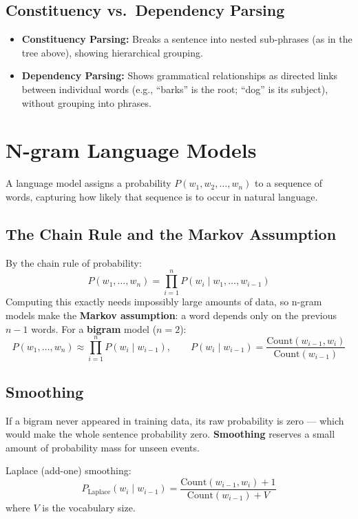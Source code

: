\documentclass[11pt,a4paper]{article}
\begin{document}
\subsection{Constituency vs.\ Dependency Parsing}
\begin{itemize}[leftmargin=*]
  \item \textbf{Constituency Parsing:} Breaks a sentence into nested sub-phrases (as in the tree above), showing hierarchical grouping.
  \item \textbf{Dependency Parsing:} Shows grammatical relationships as directed links between individual words (e.g., ``barks'' is the root; ``dog'' is its subject), without grouping into phrases.
\end{itemize}

\section{N-gram Language Models}

\begin{definitionbox}
A language model assigns a probability $P(w_1, w_2, \ldots, w_n)$ to a sequence of words, capturing how likely that sequence is to occur in natural language.
\end{definitionbox}

\subsection{The Chain Rule and the Markov Assumption}
By the chain rule of probability:
$$
P(w_1,\ldots,w_n) = \prod_{i=1}^{n} P(w_i \mid w_1,\ldots,w_{i-1})
$$
Computing this exactly needs impossibly large amounts of data, so n-gram models make the \textbf{Markov assumption}: a word depends only on the previous $n-1$ words. For a \textbf{bigram} model ($n=2$):
$$
P(w_1,\ldots,w_n) \approx \prod_{i=1}^{n} P(w_i \mid w_{i-1}), \qquad
P(w_i\mid w_{i-1}) = \frac{\text{Count}(w_{i-1}, w_i)}{\text{Count}(w_{i-1})}
$$

\subsection{Smoothing}
\begin{conceptbox}
If a bigram never appeared in training data, its raw probability is zero --- which would make the whole sentence probability zero. \textbf{Smoothing} reserves a small amount of probability mass for unseen events.
\end{conceptbox}
Laplace (add-one) smoothing:
$$
P_{\text{Laplace}}(w_i\mid w_{i-1}) = \frac{\text{Count}(w_{i-1},w_i)+1}{\text{Count}(w_{i-1})+V}
$$
where $V$ is the vocabulary size.
\end{document}
